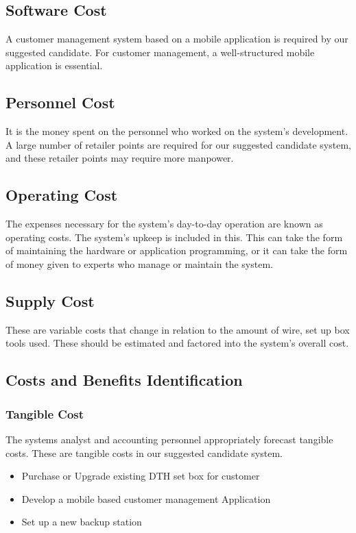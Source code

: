 \begin{spacing}{1}
\subsection {Software Cost}
A customer management system based on a mobile application is required by our suggested candidate. For customer management, a well-structured mobile application is essential.
\subsection{Personnel Cost}
It is the money spent on the personnel who worked on the system's development. A large number of retailer points are required for our suggested candidate system, and these retailer points may require more manpower.
\subsection{Operating Cost}
The expenses necessary for the system's day-to-day operation are known as operating costs. The system's upkeep is included in this. This can take the form of maintaining the hardware or application programming, or it can take the form of money given to experts who manage or maintain the system.
\subsection{Supply Cost}
These are variable costs that change in relation to the amount of wire, set up box tools used. These should be estimated and factored into the system's overall cost.

\subsection{ Costs and Benefits Identification}
\subsubsection{Tangible Cost}
The systems analyst and accounting personnel appropriately forecast tangible costs. These are tangible costs in our suggested candidate system.
\begin{itemize}
\item Purchase or Upgrade existing DTH set box for customer 
\item Develop a mobile based customer management Application
\item Set up a new backup station
\end{itemize} 


\end{spacing}
